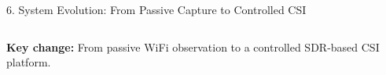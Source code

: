 \documentclass[aspectratio=169,11pt]{beamer}
\begin{document}
\begin{frame}{6. System Evolution: From Passive Capture to Controlled CSI}
\begin{columns}[T,totalwidth=\textwidth]

\end{columns}

\vspace{0.35cm}

\begin{center}
\textbf{\color{AmritaMaroon}Key change:}
From passive WiFi observation to a controlled SDR-based CSI platform.
\end{center}

\end{frame}


\end{document}
